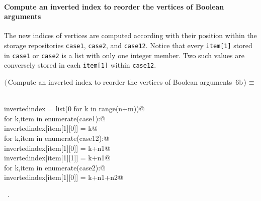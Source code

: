 \documentclass[11pt,oneside]{article}	%
\begin{document}
\paragraph{Compute an inverted index to reorder the vertices of Boolean arguments}
The new indices of vertices are computed according with their position within the storage repositories \texttt{case1}, \texttt{case2}, and \texttt{case12}. Notice that every \texttt{item[1]} stored in \texttt{case1} or \texttt{case2} is a list with only one integer member. Two such values are conversely stored in each \texttt{item[1]} within \texttt{case12}.
\begin{flushleft} \small \label{scrap7}
\protect{}$\langle\,$Compute an inverted index to reorder the vertices of Boolean arguments\nobreak\ {\footnotesize 6b}$\,\rangle\equiv$
\vspace{-1ex}
\begin{list}{}{} \item
\mbox{}\verb@@\\
\mbox{}\verb@   invertedindex = list(0 for k in range(n+m))@\\
\mbox{}\verb@   for k,item in enumerate(case1):@\\
\mbox{}\verb@      invertedindex[item[1][0]] = k@\\
\mbox{}\verb@   for k,item in enumerate(case12):@\\
\mbox{}\verb@      invertedindex[item[1][0]] = k+n1@\\
\mbox{}\verb@      invertedindex[item[1][1]] = k+n1@\\
\mbox{}\verb@   for k,item in enumerate(case2):@\\
\mbox{}\verb@      invertedindex[item[1][0]] = k+n1+n2@\\
\mbox{}\verb@@{\NWsep}
\end{list}
\vspace{-1ex}
\footnotesize\addtolength{\baselineskip}{-1ex}
\begin{list}{}{\setlength{\itemsep}{-\parsep}\setlength{\itemindent}{-\leftmargin}}
\item \NWtxtMacroRefIn\ .
\end{list}
\end{flushleft}

\end{document}
